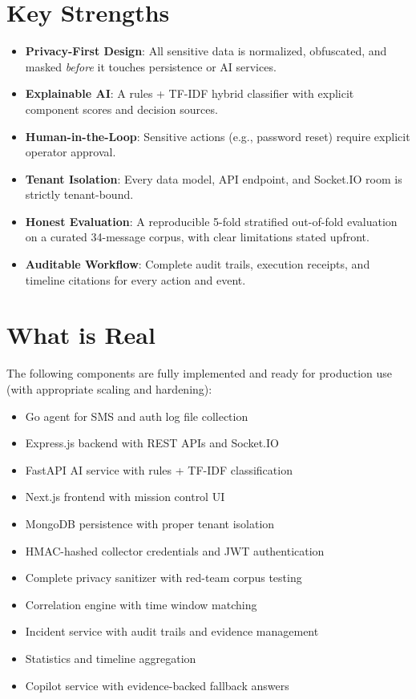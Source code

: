\documentclass[12pt,a4paper,twoside]{report}
\begin{document}
\section{Key Strengths}
\begin{itemize}[label=$\checkmark$, leftmargin=*]
    \item \textbf{Privacy-First Design}: All sensitive data is normalized, obfuscated, and masked \textit{before} it touches persistence or AI services.
    \item \textbf{Explainable AI}: A rules + TF-IDF hybrid classifier with explicit component scores and decision sources.
    \item \textbf{Human-in-the-Loop}: Sensitive actions (e.g., password reset) require explicit operator approval.
    \item \textbf{Tenant Isolation}: Every data model, API endpoint, and Socket.IO room is strictly tenant-bound.
    \item \textbf{Honest Evaluation}: A reproducible 5-fold stratified out-of-fold evaluation on a curated 34-message corpus, with clear limitations stated upfront.
    \item \textbf{Auditable Workflow}: Complete audit trails, execution receipts, and timeline citations for every action and event.
\end{itemize}

\section{What is Real}
The following components are fully implemented and ready for production use (with appropriate scaling and hardening):
\begin{itemize}[noitemsep]
    \item Go agent for SMS and auth log file collection
    \item Express.js backend with REST APIs and Socket.IO
    \item FastAPI AI service with rules + TF-IDF classification
    \item Next.js frontend with mission control UI
    \item MongoDB persistence with proper tenant isolation
    \item HMAC-hashed collector credentials and JWT authentication
    \item Complete privacy sanitizer with red-team corpus testing
    \item Correlation engine with time window matching
    \item Incident service with audit trails and evidence management
    \item Statistics and timeline aggregation
    \item Copilot service with evidence-backed fallback answers
\end{itemize}
\end{document}
